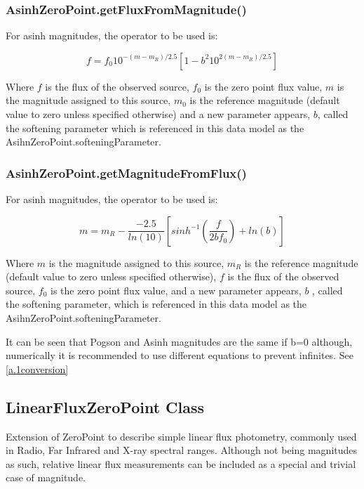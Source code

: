 \documentclass[11pt,a4paper]{ivoa}
\begin{document}

\subsubsection{AsinhZeroPoint.getFluxFromMagnitude()}
For asinh magnitudes, the operator to be used is:\par
\begin{equation} \label{eq:27}
f = f_0 10^{-(m-m_R )/2.5} \left[ 1-b^2 10^{2(m-m_R )/2.5}\right]
\end{equation}

Where $f$ is the flux of the observed source, $f_0$ is the zero
point flux value, $m$ is the magnitude assigned to this source,
$m_0$ is the reference magnitude (default value to zero unless
specified otherwise) and a new parameter appears, $b$, called the
softening parameter which is referenced in this data model as the
AsihnZeroPoint.softeningParameter.
\par

\subsubsection{AsinhZeroPoint.getMagnitudeFromFlux()}
For asinh magnitudes, the operator to be used is:\par
\begin{equation} \label{eq:28}
m = m_R - \frac{-2.5}{ln(10)}\left[ sinh^{-1}\left (\frac{f}{2bf_0}\right) + ln(b) \right]
\end{equation}

Where $m$ is the magnitude assigned to this source, $m_R$ is the
reference magnitude (default value to zero unless specified otherwise),
$f$ is the flux of the observed source, $f_0$ is the zero point flux value,
and a new parameter appears, $b$ , called the softening parameter,
which is referenced in this data model as the AsihnZeroPoint.softeningParameter.
\par

It can be seen that Pogson and Asinh magnitudes are the same if b=0
although, numerically it is recommended to use different equations
to prevent infinites. See \ref{a.1conversion}
\par

\subsection{LinearFluxZeroPoint Class}
Extension of ZeroPoint  to describe simple linear flux photometry,
commonly used in Radio, Far Infrared and X-ray spectral ranges.
Although not being magnitudes as such, relative linear flux measurements
can be included as a special and trivial case of magnitude.\par
\end{document}
